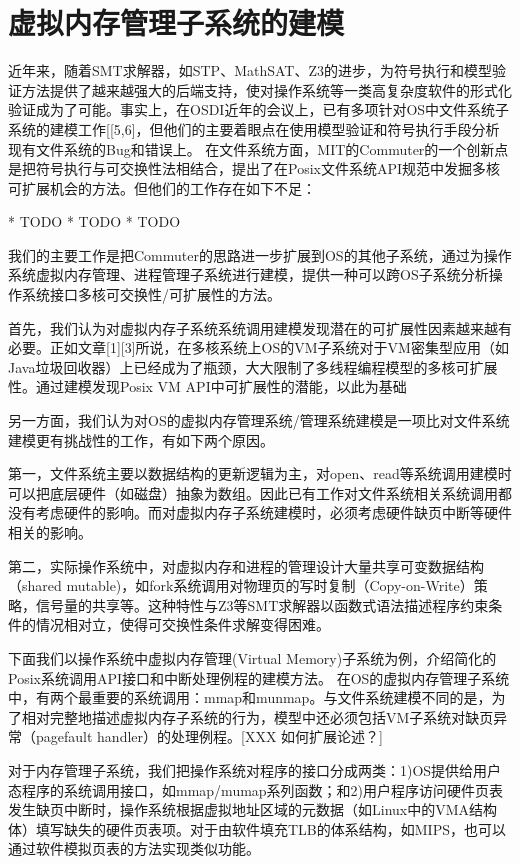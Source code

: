 \section{虚拟内存管理子系统的建模}

近年来，随着SMT求解器，如STP、MathSAT、Z3的进步，为符号执行和模型验证方法提供了越来越强大的后端支持，使对操作系统等一类高复杂度软件的形式化验证成为了可能。事实上，在OSDI近年的会议上，已有多项针对OS中文件系统子系统的建模工作[[5,6]，但他们的主要着眼点在使用模型验证和符号执行手段分析现有文件系统的Bug和错误上。
在文件系统方面，MIT的Commuter\cite{commuter:2013}的一个创新点是把符号执行与可交换性法相结合，提出了在Posix文件系统API规范中发掘多核可扩展机会的方法。但他们的工作存在如下不足：

* TODO 
* TODO
* TODO

我们的主要工作是把Commuter的思路进一步扩展到OS的其他子系统，通过为操作系统虚拟内存管理、进程管理子系统进行建模，提供一种可以跨OS子系统分析操作系统接口多核可交换性/可扩展性的方法。

首先，我们认为对虚拟内存子系统系统调用建模发现潜在的可扩展性因素越来越有必要。正如文章[1][3]所说，在多核系统上OS的VM子系统对于VM密集型应用（如Java垃圾回收器）上已经成为了瓶颈，大大限制了多线程编程模型的多核可扩展性。通过建模发现Posix
VM API中可扩展性的潜能，以此为基础

另一方面，我们认为对OS的虚拟内存管理系统/管理系统建模是一项比对文件系统建模更有挑战性的工作，有如下两个原因。

第一，文件系统主要以数据结构的更新逻辑为主，对open、read等系统调用建模时可以把底层硬件（如磁盘）抽象为数组。因此已有工作对文件系统相关系统调用都没有考虑硬件的影响。而对虚拟内存子系统建模时，必须考虑硬件缺页中断等硬件相关的影响。

第二，实际操作系统中，对虚拟内存和进程的管理设计大量共享可变数据结构（shared
mutable)，如fork系统调用对物理页的写时复制（Copy-on-Write）策略，信号量的共享等。这种特性与Z3等SMT求解器以函数式语法描述程序约束条件的情况相对立，使得可交换性条件求解变得困难。


下面我们以操作系统中虚拟内存管理(Virtual
		Memory)子系统为例，介绍简化的Posix系统调用API接口和中断处理例程的建模方法。
在OS的虚拟内存管理子系统中，有两个最重要的系统调用：mmap和munmap。与文件系统建模不同的是，为了相对完整地描述虚拟内存子系统的行为，模型中还必须包括VM子系统对缺页异常（pagefault
handler）的处理例程。[XXX 如何扩展论述？]

对于内存管理子系统，我们把操作系统对程序的接口分成两类：1)OS提供给用户态程序的系统调用接口，如mmap/mumap系列函数；和2)用户程序访问硬件页表发生缺页中断时，操作系统根据虚拟地址区域的元数据（如Linux中的VMA结构体）填写缺失的硬件页表项。对于由软件填充TLB的体系结构，如MIPS，也可以通过软件模拟页表的方法实现类似功能。

